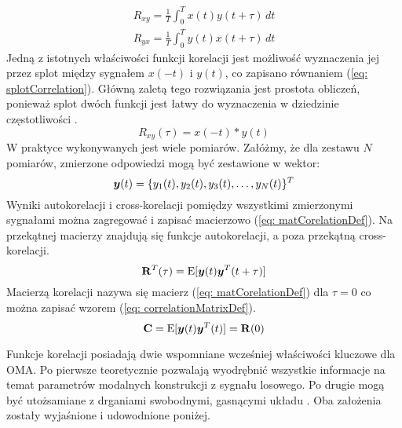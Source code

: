 \begin{equation} \label{eq: timeAveCrosscorrelation}
	\begin{aligned}
	R_{xy} = \frac{1}{T}\int_{0}^{T}x(t)y(t+\tau) \,dt \\
	R_{yx} = \frac{1}{T}\int_{0}^{T}y(t)x(t+\tau) \,dt 
\end{aligned}
\end{equation}
Jedną z istotnych właściwości funkcji korelacji jest możliwość wyznaczenia jej przez splot między sygnałem $x(-t)$ i $y(t)$, co zapisano równaniem (\ref{eq: splotCorrelation}). Główną zaletą tego rozwiązania jest prostota obliczeń, ponieważ splot dwóch funkcji jest łatwy do wyznaczenia w dziedzinie częstotliwości \parencite{Brincker2015}.
\begin{equation} \label{eq: splotCorrelation}
	R_{xy}(\tau)=x(-t)*y(t)
\end{equation}
W praktyce wykonywanych jest wiele pomiarów. Załóżmy, że dla zestawu $N$ pomiarów, zmierzone odpowiedzi mogą być zestawione w wektor:
\begin{equation}
\bm{y}(t) = \{y_1(t),y_2(t),y_3(t), \hdots ,y_N(t)\}^T
\end{equation}
Wyniki autokorelacji i cross-korelacji pomiędzy wszystkimi zmierzonymi sygnałami można zagregować i zapisać macierzowo (\ref{eq: matCorelationDef}). Na przekątnej macierzy znajdują się funkcje autokorelacji, a poza przekątną cross-korelacji.
\begin{equation} \label{eq: matCorelationDef}
	\mathbf{R}^T(\tau)=\mathrm{E}[\bm{y}(t)\bm{y}^T(t+\tau)]
\end{equation}
Macierzą korelacji  nazywa się macierz (\ref{eq: matCorelationDef}) dla $\tau=0$ co można zapisać wzorem (\ref{eq: correlationMatrixDef}).
\begin{equation} \label{eq: correlationMatrixDef}
	\mathbf{C}=\mathrm{E}[\bm{y}(t)\bm{y}^T(t)]=\mathbf{R}(0)
\end{equation}

Funkcje korelacji posiadają dwie wspomniane wcześniej właściwości kluczowe dla OMA. Po pierwsze teoretycznie pozwalają wyodrębnić wszystkie informacje na temat parametrów modalnych konstrukcji z sygnału losowego. Po drugie mogą być utożsamiane z drganiami swobodnymi, gasnącymi układu \parencite{James1995}. Oba założenia zostały wyjaśnione i udowodnione poniżej.

